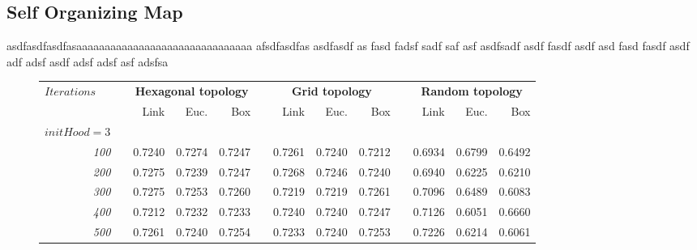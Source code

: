 \documentclass[a4paper, 10pt]{article}
\begin{document}
  \subsection{Self Organizing Map}
  asdfasdfasdfasaaaaaaaaaaaaaaaaaaaaaaaaaaaaaaa afsdfasdfas asdfasdf as fasd fadsf sadf saf asf
  asdfsadf asdf  fasdf asdf asd fasd fasdf asdf adf adsf asdf adsf adsf asf adsfsa
    \begin{figure}[h]
      \centering
      \hfill
      \begin{tabular}{@{}rcrrrcrrrcrrr@{}}
        \toprule
        \multicolumn{1}{l}{\multirow{2}{*}{$Iterations$}} & \phantom{a} &%
          \multicolumn{3}{c}{\textbf{Hexagonal topology}} & \phantom{a} &
          \multicolumn{3}{c}{\textbf{Grid topology}}      & \phantom{a} &
          \multicolumn{3}{c}{\textbf{Random topology}} \\
        \cmidrule{3-5} \cmidrule{7-9} \cmidrule{11-13}
        && Link & Euc. & Box && Link & Euc. & Box && Link & Euc. & Box  \\
        \midrule
        $initHood = 3$ \\
        \emph{100}  &&  0.7240  &  0.7274  &  0.7247  &&  0.7261  &  0.7240  &  0.7212  &&  0.6934  &  0.6799  &  0.6492 \\
        \emph{200}  &&  0.7275  &  0.7239  &  0.7247  &&  0.7268  &  0.7246  &  0.7240  &&  0.6940  &  0.6225  &  0.6210 \\
        \emph{300}  &&  0.7275  &  0.7253  &  0.7260  &&  0.7219  &  0.7219  &  0.7261  &&  0.7096  &  0.6489  &  0.6083 \\
        \emph{400}  &&  0.7212  &  0.7232  &  0.7233  &&  0.7240  &  0.7240  &  0.7247  &&  0.7126  &  0.6051  &  0.6660 \\
        \emph{500}  &&  0.7261  &  0.7240  &  0.7254  &&  0.7233  &  0.7240  &  0.7253  &&  0.7226  &  0.6214  &  0.6061 \\

\end{tabular}
\end{figure}
\end{document}
